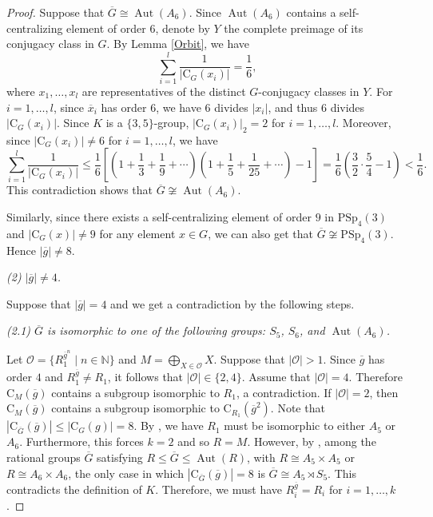 \documentclass[11pt]{article}
\providecommand{\bbN}{{\mathbb N}} %
\providecommand{\PSp}{{\mathrm{PSp}}}
\providecommand{\C}{{\mathrm{C}}}
\providecommand{\Aut}{{\operatorname{Aut}}}
\providecommand{\olg}{{\overline{g}}}
\providecommand{\olG}{{\overline{G}}}
\providecommand{\calO}{\mathcal{O}}
\providecommand{\bbN}{\mathbb{N}}
\begin{document}
\begin{proof}
    Suppose that $\olG \cong \Aut(A_6)$.
    Since $\Aut(A_6)$ contains a self-centralizing element of order $6$,
    denote by $Y$ the complete preimage of its conjugacy class in $G$.
    By Lemma \ref{Orbit}, we have
    $$\sum_{i=1}^{l} \dfrac{1}{|\C_G(x_i)|} = \dfrac{1}{6},$$
    where $x_1, \ldots, x_l$ are representatives of the distinct $G$-conjugacy classes in $Y$.
    For $i=1,\ldots,l$, since $\overline{x}_i$ has order $6$, we have
    $6$ divides $|x_i|$, and thus $6$ divides $|\C_G(x_i)|$.
    Since $K$ is a $\{3,5\}$-group, $|\C_G(x_i)|_2 = 2$ for $i=1,\ldots,l$.
    Moreover, since $|\C_G(x_i)| \neq 6$ for $i=1,\ldots,l$, we have
    $$\sum_{i=1}^{l}\dfrac{1}{|\C_G(x_i)|} \leq \dfrac{1}{6} \left[ \left(1 + \dfrac{1}{3} + \dfrac{1}{9} + \cdots\right)\left(1 + \dfrac{1}{5} + \dfrac{1}{25} + \cdots\right) - 1 \right] = \dfrac{1}{6} \left(\dfrac{3}{2} \cdot \dfrac{5}{4} - 1\right) < \dfrac{1}{6}.$$
    This contradiction shows that $\olG \not\cong \Aut(A_6)$.

    Similarly, since there exists a self-centralizing element of order $9$ in $\PSp_4(3)$ and $|\C_G(x)| \neq 9$ for any element $x \in G$, 
    we can also get that $\olG \not\cong \PSp_4(3)$.
    Hence $|\olg| \neq 8$.

\medskip
{\sl (2) $|\olg|\neq 4$. } 

    Suppose that $|\olg|=4$ and we get a contradiction by the following steps.

{\sl (2.1) $\overline G$ is isomorphic to one of the following groups:
$S_5$, $S_6$, and $\Aut(A_6)$.} 
    
    Let $\calO = \{R_1^{\olg^n}\mid n\in \bbN\}$ and $M=\bigoplus_{X\in \calO} X$.
    Suppose that $|\calO|>1$.
    Since $\olg$ has order $4$ and $R_1^{\olg} \neq R_1$, it follows that $|\calO|\in \{2,4\}$.
    Assume that $|\calO|=4$.
    Therefore $\C_M(\olg)$ contains a subgroup isomorphic to $R_1$, a contradiction.
    If $|\calO|=2$,
    then $\C_M(\olg)$ contains a subgroup isomorphic to $\C_{R_1}(\olg^2)$.
    Note that $|\C_{\olG}(\olg)|\leq |\C_G(g)|=8$.
    By \cite[Code 1]{Git}, we have $R_1$ must be isomorphic to either $A_5$ or $A_6$.
    Furthermore, this forces $k=2$ and so $R=M$.
    However, by \cite[Code 3, Code 7]{Git}, 
    among the rational groups $\olG$ satisfying $R\leq \olG\leq \Aut(R)$, 
    with $R\cong A_5\times A_5$ or $R\cong A_6\times A_6$, 
    the only case in which $|\C_{\olG}(\olg)|=8$ is $\olG\cong A_5\rtimes S_5$.
    This contradicts the definition of $K$.
    Therefore, we must have $R_i^{\olg}=R_i$ for $i=1,\ldots,k$.
    

\end{proof}
\end{document}
